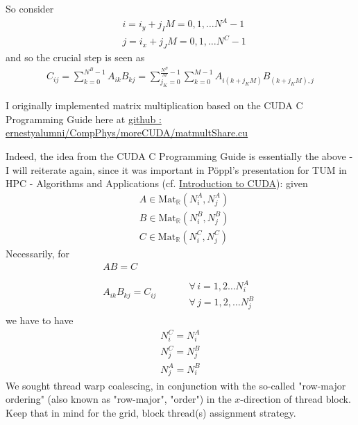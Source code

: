 \documentclass[10pt]{amsart}
\begin{document}
\begin{multicols*}{2}
So consider 
\[
\begin{aligned}
	& i = i_y +j_IM = 0,1,\dots N^A -1 \\ 
	& j = i_x + j_JM = 0,1,\dots N^C - 1 
\end{aligned}
\]
and so the crucial step is seen as 
\[
\begin{gathered}
	C_{ij} = \sum_{k=0}^{N^B-1} A_{ik} B_{kj} = \sum_{j_K=0}^{\frac{N^B}{M}-1} \sum_{k=0}^{M-1} A_{i(k+j_KM)}B_{(k+j_KM), j}
\end{gathered}
\]

I originally implemented matrix multiplication based on the CUDA C Programming Guide here at \href{https://github.com/ernestyalumni/CompPhys/blob/master/moreCUDA/matmultShare.cu}{github : ernestyalumni/CompPhys/moreCUDA/matmultShare.cu}

Indeed, the idea from the CUDA C Programming Guide is essentially the above - I will reiterate again, since it was important in P\"oppl's presentation for TUM in HPC - Algorithms and Applications (cf. \href{http://www5.in.tum.de/lehre/vorlesungen/hpc/WS16/tutorial/cuda_p2.pdf}{Introduction to CUDA}): given
\[
\begin{aligned}
	& A \in \text{Mat}_{\mathbb{R}}(N_i^A,N_j^A) \\ 
	& B \in \text{Mat}_{\mathbb{R}}(N_i^B,N_j^B) \\
	& C \in \text{Mat}_{\mathbb{R}}(N_i^C,N_j^C) 
\end{aligned}
\]
Necessarily, for 
\begin{equation}
\begin{gathered}
AB=C \\
A_{ik}B_{kj} =C_{ij}  \qquad \, \begin{aligned} & \qquad \\ 
	& \forall \, i = 1,2\dots N_i^A \\ 
	& \forall \, j = 1,2,\dots N_j^B \end{aligned}
\end{gathered}
\end{equation}
we have to have 
\[
\begin{gathered}
N_i^C = N_i^A \\
N_j^C = N_j^B \\
N_j^A = N^B_i
\end{gathered}
\]
We sought thread warp coalescing, in conjunction with the so-called "row-major ordering" (also known as "row-major", "order") in the $x$-direction of thread block.  Keep that in mind for the grid, block thread(s) assignment strategy.  


\end{multicols*}
\end{document}
